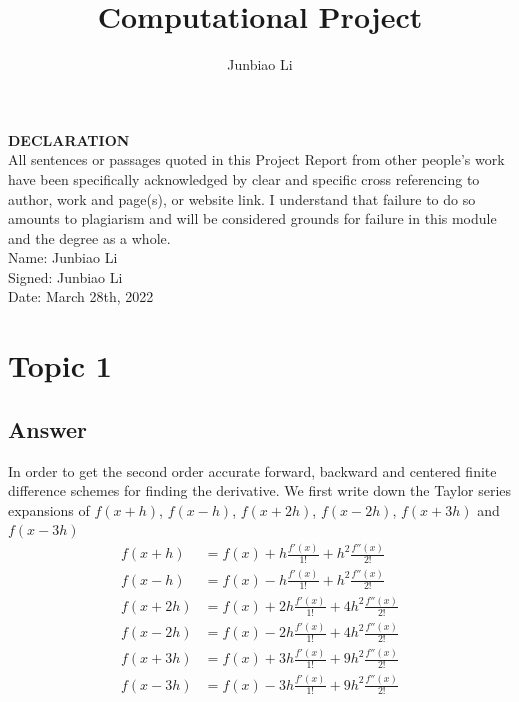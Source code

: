 \documentclass[
	12pt, %
]{fphw}
\title{Computational Project} %
\author{Junbiao Li} %
\institute{University of Leicester} %
\begin{document}
 

\maketitle %

\begin{problem}
	\textbf{DECLARATION} \\
	All sentences or passages quoted in this Project Report from other people's work have been specifically acknowledged by clear and specific cross referencing to author, work and page(s), or website link. I understand that failure to do so amounts to plagiarism and will be considered grounds for failure in this module and the degree as a whole.\\
	Name: Junbiao Li\\
	Signed: Junbiao Li\\
	Date: March 28th, 2022
\end{problem}

\section*{Topic 1}



\subsection*{Answer}

In order to get the second order accurate forward, backward and centered finite difference
schemes for finding the derivative. We first write down the Taylor series expansions of $f(x+h)$, $f(x-h)$, $f(x+2h)$,  $f(x-2h)$, $f(x+3h)$ and $f(x-3h)$
\[
\begin{aligned}
f(x+h) &=f(x)+h\frac{f'(x)}{1 !}+h^2 \frac{f''(x)}{2 !} \\
f(x-h) &=f(x)-h\frac{f'(x)}{1 !}+h^2 \frac{f''(x)}{2 !} \\
f(x+2h) &=f(x)+2h\frac{f'(x)}{1 !}+4h^2 \frac{f''(x)}{2 !} \\
f(x-2h) &=f(x)-2h\frac{f'(x)}{1 !}+4h^2 \frac{f''(x)}{2 !} \\
f(x+3h) &=f(x)+3h\frac{f'(x)}{1 !}+9h^2 \frac{f''(x)}{2 !} \\
f(x-3h) &=f(x)-3h\frac{f'(x)}{1 !}+9h^2 \frac{f''(x)}{2 !} \\
\end{aligned}
\]
\end{document}

